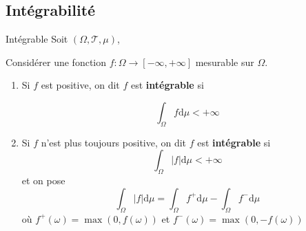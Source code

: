 \subsection{Intégrabilité} %
\label{sub:Intégrabilité}

\begin{Definition}[colbacktitle=red!75!black]{Intégrable}{}
Soit $(\Omega, \mathcal{T}, \mu)$, 

Considérer une fonction $f: \Omega \to [- \infty, + \infty]$ mesurable sur $\Omega$. 
\begin{enumerate}

    \item Si $f$ est positive, on dit $f$ est \textbf{intégrable} si 

      \begin{equation}
        \int_{\Omega}^{} f \mathrm{d} \mu < + \infty
      \end{equation}

    \item Si $f$ n'est plus toujours positive, on dit $f$ est \textbf{intégrable} si 
      \begin{equation}
        \int_{\Omega}^{}|f| \mathrm{d}\mu < + \infty
      \end{equation}
      et on pose 
      \begin{equation}
        \int_{\Omega}^{} |f| \mathrm{d}\mu = \int_{\Omega}^{} f^+ \mathrm{d}\mu - \int_{\Omega}^{} f ^{-} \mathrm{d} \mu
      \end{equation}
      où $f ^{+} (\omega) = \max ( 0, f(\omega))$ et $f ^{-}(\omega) = \max ( 0, - f(\omega))$

\end{enumerate}

\end{Definition}

